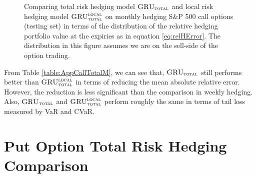 \documentclass[letterpaper,12pt,titlepage,oneside,final]{book}
\numberwithin{equation}{section}
\theoremstyle{definition}
\newcommand{\modelT}{\textsc{GRU}_{\textsc{total}}}
\newcommand{\modelL}{\textsc{GRU}_{\textsc{total}}^{\textsc{local}}}
\begin{document}
\begin{figure}[htp!]
	\centering
	\caption{Comparing total risk hedging model $\modelT$ and local risk hedging model $\modelL$ on monthly hedging S\&P 500 call options (testing set) in terms of the distribution of the  relative hedging portfolio value at the expiries as in equation \eqref{eq:relHError}. The distribution in this figure assumes we are on the sell-side of the option trading.} \label{fig:AppCallTotalM1}
\end{figure}
From Table \ref{table:AppCallTotalM}, we can see that, $\modelT$ still performs better than $\modelL$ in terms of reducing the mean absolute relative error. However, the reduction is less significant than the comparison in weekly hedging. Also, $\modelT$ and $\modelL$ perform roughly the same in terms of tail loss measured by VaR and CVaR.
\section{Put Option Total Risk Hedging Comparison}
\end{document}
